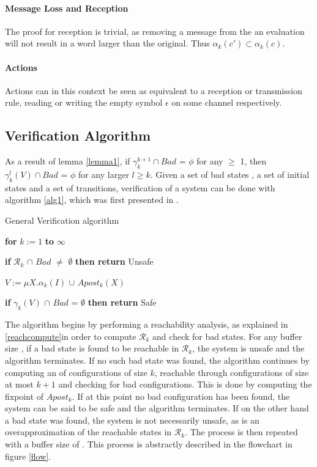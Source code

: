 \paragraph{Message Loss and Reception}
\label{proofreception}
The proof for reception is trivial, as removing a message from the an evaluation will not result in a word larger than the original. Thus $\alpha_k(c') \subset \alpha_k(c)$.

\paragraph{Actions}
Actions can in this context be seen as equivalent to a reception or transmission rule, reading or writing the empty symbol $\epsilon$ on some channel respectively.

\subsection{Verification Algorithm}
\label{verificationalgorithm}
As a result of lemma \ref{lemma1}, if $\gamma_k^{k+1} \cap Bad$ = $\phi$ for any  $\geq$ 1, then $\gamma_k^l(V) \cap Bad$ = $\phi$ for any larger $l \geq k$. Given a set of bad states , a set of initial states  and a set of transitions, verification of a system can be done with algorithm \ref{alg1}, which was first presented in \cite{parosh}.

\begin{algorithm}
  \caption{General Verification algorithm}
  \label{alg1}
    \hspace{8pt}\textbf{for} $k := 1$ \textbf{to} $\infty$

    \hspace{16pt}\textbf{if} $\mathcal{R}_k$ $\cap$ $Bad$ $\neq$ $\emptyset$ \textbf{then return} Unsafe

    \hspace{16pt}$V := \mu X.\alpha_k(I)$ $\cup$ $Apost_k(X)$

    \hspace{16pt}\textbf{if} {$\gamma_k(V)$ $\cap$ $Bad$ = $\emptyset$} \textbf{then return} Safe
\end{algorithm}

The algorithm begins by performing a reachability analysis, as explained in \ref{reachcompute}in order to compute $\mathcal{R}_k$ and check for bad states. For any buffer size , if a bad state is found to be reachable in $\mathcal{R}_k$, the system is unsafe and the algorithm terminates. If no such bad state was found, the algorithm continues by computing an  of configurations of size $k$, reachable through configurations of size at most $k+1$ and checking for bad configurations. This is done by computing the fixpoint of $Apost_k$. If at this point no bad configuration has been found, the system can be said to be safe and the algorithm terminates. If on the other hand a bad state was found, the system is not necessarily unsafe, as  is an overapproximation of the reachable states in $\mathcal{R}_k$. The process is then repeated with a buffer size of . This process is abstractly described in the flowchart in figure \ref{flow}.

